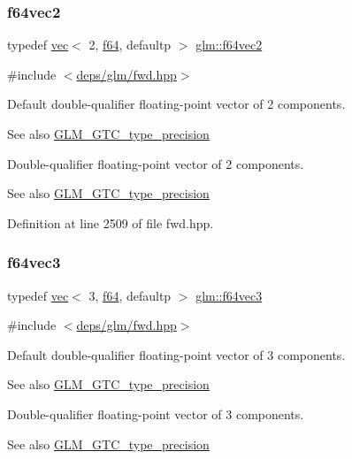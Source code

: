 \subsubsection{\texorpdfstring{f64vec2}{f64vec2}}
{\footnotesize\ttfamily typedef \hyperlink{structglm_1_1vec}{vec}$<$ 2, \hyperlink{group__gtc__type__precision_ga2bba392e555124b36cde6abba349bab3}{f64}, defaultp $>$ \hyperlink{group__gtc__type__precision_ga6c794781267fd5c810d9a6e7086e02a6}{glm\+::f64vec2}}



{\ttfamily \#include $<$\hyperlink{fwd_8hpp}{deps/glm/fwd.\+hpp}$>$}

Default double-\/qualifier floating-\/point vector of 2 components. \begin{DoxySeeAlso}{See also}
\hyperlink{group__gtc__type__precision}{G\+L\+M\+\_\+\+G\+T\+C\+\_\+type\+\_\+precision}
\end{DoxySeeAlso}
Double-\/qualifier floating-\/point vector of 2 components. \begin{DoxySeeAlso}{See also}
\hyperlink{group__gtc__type__precision}{G\+L\+M\+\_\+\+G\+T\+C\+\_\+type\+\_\+precision} 
\end{DoxySeeAlso}


Definition at line 2509 of file fwd.\+hpp.

\mbox{\label{group__gtc__type__precision_ga659b65d8792f93da76c2da44f06e0b8b}} 
\subsubsection{\texorpdfstring{f64vec3}{f64vec3}}
{\footnotesize\ttfamily typedef \hyperlink{structglm_1_1vec}{vec}$<$ 3, \hyperlink{group__gtc__type__precision_ga2bba392e555124b36cde6abba349bab3}{f64}, defaultp $>$ \hyperlink{group__gtc__type__precision_ga659b65d8792f93da76c2da44f06e0b8b}{glm\+::f64vec3}}



{\ttfamily \#include $<$\hyperlink{fwd_8hpp}{deps/glm/fwd.\+hpp}$>$}

Default double-\/qualifier floating-\/point vector of 3 components. \begin{DoxySeeAlso}{See also}
\hyperlink{group__gtc__type__precision}{G\+L\+M\+\_\+\+G\+T\+C\+\_\+type\+\_\+precision}
\end{DoxySeeAlso}
Double-\/qualifier floating-\/point vector of 3 components. \begin{DoxySeeAlso}{See also}
\hyperlink{group__gtc__type__precision}{G\+L\+M\+\_\+\+G\+T\+C\+\_\+type\+\_\+precision} 
\end{DoxySeeAlso}


